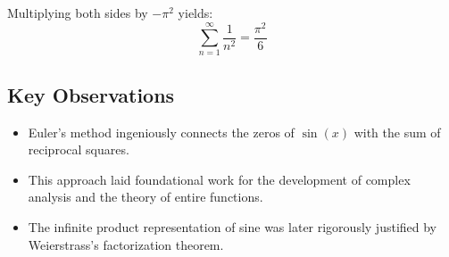 Multiplying both sides by \( -\pi^2 \) yields:
\[
\sum_{n=1}^{\infty} \frac{1}{n^2} = \frac{\pi^2}{6}
\]

\subsection{Key Observations}

\begin{itemize}[label=\(-\)]
    \item Euler's method ingeniously connects the zeros of \( \sin(x) \) with the sum of reciprocal squares.
    \item This approach laid foundational work for the development of complex analysis and the theory of entire functions.
    \item The infinite product representation of sine was later rigorously justified by Weierstrass's factorization theorem.
\end{itemize}
